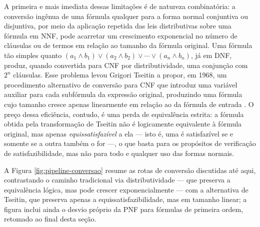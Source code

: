 \documentclass[12pt,a4paper,oneside]{report}
\theoremstyle{tituloplain}
\theoremstyle{titulodef}
\begin{document}
A primeira e mais imediata dessas limitações é de natureza combinatória: a conversão ingênua de uma fórmula qualquer para a forma normal conjuntiva ou disjuntiva, por meio da aplicação repetida das leis distributivas sobre uma fórmula em NNF, pode acarretar um crescimento exponencial no número de cláusulas ou de termos em relação ao tamanho da fórmula original. Uma fórmula tão simples quanto $(a_1 \wedge b_1) \vee (a_2 \wedge b_2) \vee \cdots \vee (a_n \wedge b_n)$, já em DNF, produz, quando convertida para CNF por distributividade, uma conjunção com $2^n$ cláusulas. Esse problema levou Grigori Tseitin a propor, em 1968, um procedimento alternativo de conversão para CNF que introduz uma variável auxiliar para cada subfórmula da expressão original, produzindo uma fórmula cujo tamanho cresce apenas linearmente em relação ao da fórmula de entrada \cite{tseitin1968}. O preço dessa eficiência, contudo, é uma perda de equivalência estrita: a fórmula obtida pela transformação de Tseitin não é logicamente equivalente à fórmula original, mas apenas \textit{equissatisfazível} a ela — isto é, uma é satisfazível se e somente se a outra também o for —, o que basta para os propósitos de verificação de satisfazibilidade, mas não para todo e qualquer uso das formas normais.
 
A Figura \ref{fig:pipeline-conversao} resume as rotas de conversão discutidas até aqui, contrastando o caminho tradicional via distributividade — que preserva a equivalência lógica, mas pode crescer exponencialmente — com a alternativa de Tseitin, que preserva apenas a equissatisfazibilidade, mas em tamanho linear; a figura inclui ainda o desvio próprio da PNF para fórmulas de primeira ordem, retomado ao final desta seção.
 
\end{document}
